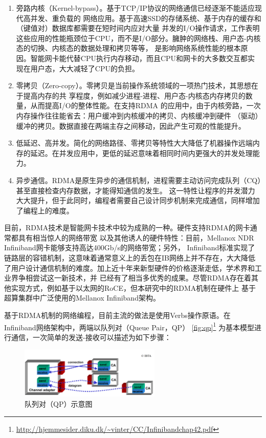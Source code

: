 \begin{enumerate}
	\item 旁路内核（Kernel-bypass）。基于TCP/IP协议的网络通信已经逐渐不能适应现代高并发、重负载的
	网络应用。基于高速SSD的存储系统、基于内存的缓存和（键值对）数据库都需要在短时间内应对大量
	并发的I/O操作请求，工作表明这些应用的性能瓶颈位于CPU，而不是I/O部分。臃肿的网络栈、用户态-内核态的切换、内核态的数据处理和拷贝等等，
	是影响网络系统性能的根本原因。智能网卡能代替CPU执行内存移动，而且CPU和网卡的大多数交互都实现在用户态，大大减轻了CPU的负担。
	\item 零拷贝（Zero-copy）。零拷贝是当前操作系统领域的一项热门技术，其思想在于提高内存的共
	享程度，例如减少进程-进程、用户态-内核态内存拷贝的数量，从而提高I/O的整体性能。在支持RDMA
	的应用中，由于内核旁路，一次内存操作往往能省去：用户缓冲到内核缓冲的拷贝、内核缓冲到硬件
	（驱动）缓冲的拷贝。数据直接在两端主存之间移动，因此产生可观的性能提升。
	\item 低延迟、高并发。简化的网络路径、零拷贝等特性大大降低了机器操作远端内存的延迟。在并发应用中，更低的延迟意味着相同时间内更强大的并发处理能力。
	\item 异步通信。RDMA是原生异步的通信机制，进程需要主动访问完成队列（CQ）甚至直接检查内存数据，才能得知通信的发生。
	这一特性让程序的并发潜力大大提升，但于此同时，编程者需要自己设计同步机制来完成通信，同样增加了编程上的难度。
\end{enumerate}

目前，RDMA技术是智能网卡技术中较为成熟的一种。硬件支持RDMA的网卡通常都具有相当惊人的网络带宽
以及其他诱人的硬件特性：目前，Mellanox NDR Infiniband网卡能够支持高达400Gb/s的网络带宽；另外，
Infiniband标准实现了链路层的容错机制，这意味着通常意义上的丢包在IB网络上并不存在，大大降低
了用户设计通信机制的难度。加上近十年来新型硬件的价格逐渐走低，学术界和工业界争相尝试这一新技术，并
已经有了相当多优秀的成果。尽管RDMA存在着其他实现方式，例如基于以太网的RoCE，但本研究中的RDMA机制在硬件上
基于超算集群中广泛使用的Mellanox Infiniband架构。

基于RDMA机制的网络编程，目前主流的做法是使用Verbs操作原语。在Infiniband网络架构中，两端以队列对（Queue Pair，QP）
\autoref{fig:qp}\footnote{\url{http://hjemmesider.diku.dk/~vinter/CC/Infinibandchap42.pdf}}
为基本模型进行通信，一次简单的发送-接收可以描述为如下步骤：

\begin{figure}[h]
	\centering
	\includegraphics[width=0.6\textwidth]{image/chap01/qp.png}
	\caption{队列对（QP）示意图}
	\label{fig:qp}
\end{figure}

